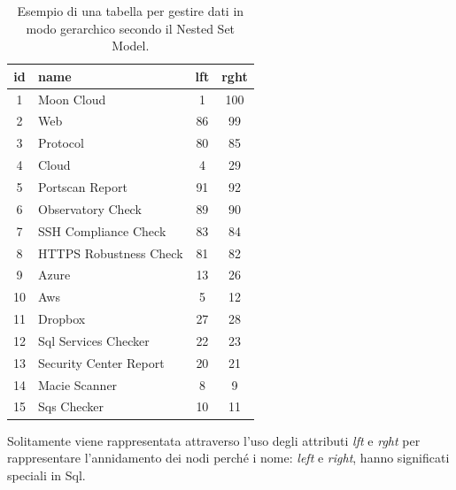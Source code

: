 \begin{table}[ht!]
\centering
\begin{tabular}[c]{| c | l | c | c |}
    \hline
    id & name & lft & rght \\ [0.5ex] 
    \hline
    \rowcolor{rootnodecell} 1 & Moon Cloud & 1 & 100 \\ [0.5ex] 
    \rowcolor{categorycell} 2 & Web & 86 & 99 \\ [0.5ex] 
    \rowcolor{categorycell} 3 & Protocol & 80 & 85 \\ [0.5ex] 
    \rowcolor{categorycell} 4 & Cloud & 4 & 29 \\ [0.5ex] 
    \rowcolor{evaluationcell} 5 & Portscan Report & 91 & 92 \\ [0.5ex] 
    \rowcolor{evaluationcell} 6 & Observatory Check & 89 & 90 \\ [0.5ex] 
    \rowcolor{evaluationcell} 7 & SSH Compliance Check & 83 & 84 \\ [0.5ex] 
    \rowcolor{evaluationcell} 8 & HTTPS Robustness Check & 81 & 82 \\ [0.5ex] 
    \rowcolor{categorycell} 9 & Azure & 13 & 26 \\ [0.5ex] 
    \rowcolor{categorycell} 10 & Aws & 5 & 12 \\ [0.5ex] 
    \rowcolor{categorycell} 11 & Dropbox & 27 & 28 \\ [0.5ex] 
    \rowcolor{evaluationcell} 12 & Sql Services Checker & 22 & 23 \\ [0.5ex] 
    \rowcolor{evaluationcell} 13 & Security Center Report & 20 & 21 \\ [0.5ex] 
    \rowcolor{evaluationcell} 14 & Macie Scanner & 8 & 9 \\ [0.5ex] 
    \rowcolor{evaluationcell} 15 & Sqs Checker & 10 & 11 \\ [0.5ex]
    \hline
\end{tabular}
\caption{Esempio di una tabella per gestire dati in modo gerarchico secondo il Nested Set Model.}
\label{table:nested_set_model_table}
\end{table}
\hfill\break
Solitamente viene rappresentata attraverso l'uso degli attributi \textit{lft} e \textit{rght} per rappresentare l'annidamento dei nodi 
perché i nome: \textit{left} e \textit{right}, hanno significati speciali in Sql.
%
